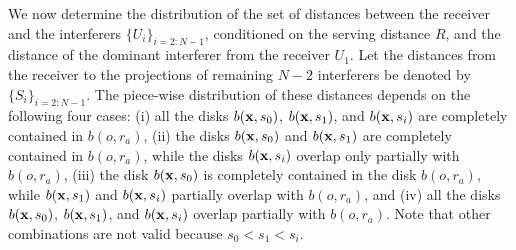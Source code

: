 \documentclass[journal,draftclsnofoot,onecolumn,12pt]{IEEEtran}
\begin{document}
We now determine the distribution of the set of distances between the receiver and the interferers $\{U_i\}_{i=2:N-1}$, conditioned on the serving distance $R$, and the distance of the dominant interferer from the receiver $U_1$. Let the distances from the receiver to the projections of remaining $N-2$ interferers be denoted by $\{S_i\}_{i=2:N-1}$. The piece-wise distribution of these distances depends on the following four cases: (i) all the disks $b({\bf{x}},s_0)$,  $b({\bf{x}},s_1)$, and  $b({\bf{x}},s_i)$ are completely contained in  $b(o,r_a)$, (ii) the disks $b({\bf{x}},s_0)$ and  $b({\bf{x}},s_1)$  are completely contained in  $b(o,r_a)$, while the disks $b({\bf{x}},s_i)$ overlap only partially with $b(o,r_a)$, (iii) the disk  $b({\bf{x}},s_0)$ is completely contained in the disk $b(o,r_a)$, while $b({\bf{x}},s_1)$ and $b({\bf{x}},s_i)$ partially overlap with $b(o,r_a)$, and (iv) all the disks $b({\bf{x}},s_0)$, $b({\bf{x}},s_1)$, and $b({\bf{x}},s_i)$ overlap partially with $b(o,r_a)$. Note that other combinations are not valid because $s_0 < s_1  < s_i$.
\end{document}
